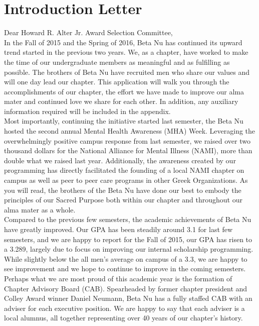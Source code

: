 \chapter{Introduction Letter}

Dear Howard R. Alter Jr. Award Selection Committee, \\

In the Fall of 2015 and the Spring of 2016, Beta Nu has continued its upward trend started in the previous two years. We, as a chapter, have worked to make the time of our undergraduate members as meaningful and as fulfilling as possible.  The brothers of Beta Nu have recruited men who share our values and will one day lead our chapter. This application will walk you through the accomplishments of our chapter, the effort we have made to improve our alma mater and continued love we share for each other. In addition, any auxiliary information required will be included in the appendix. \\

Most importantly, continuing the initiative started last semester, the Beta Nu hosted the second annual Mental Health Awareness (MHA) Week. Leveraging the overwhelmingly positive campus response from last semester, we raised over two thousand dollars for the National Alliance for Mental Illness (NAMI), more than double what we raised last year. Additionally, the awareness created by our programming has directly facilitated the founding of a local NAMI chapter on campus as well as peer to peer care programs in other Greek Organizations. As you will read, the brothers of the Beta Nu have done our best to embody the principles of our Sacred Purpose both within our chapter and throughout our alma mater as a whole. \\

Compared to the previous few semesters, the academic achievements of Beta Nu have greatly improved. Our GPA has been steadily around 3.1 for last few semesters, and we are happy to report for the Fall of 2015, our GPA has risen to a 3.289, largely due to focus on improving our internal scholarship programming. While slightly below the all men’s average on campus of a 3.3, we are happy to see improvement and we hope to continue to improve in the coming semesters. \\

Perhaps what we are most proud of this academic year is the formation of Chapter Advisory Board (CAB). Spearheaded by former chapter president and Colley Award winner Daniel Neumann, Beta Nu has a fully staffed CAB with an adviser for each executive position. We are happy to say that each adviser is a local alumnus, all together representing over 40 years of our chapter’s history. \\

